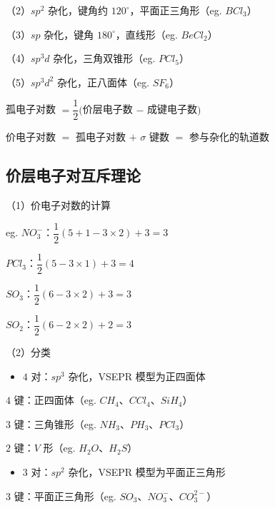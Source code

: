 \documentclass[UTF8,zihao=-4,openany]{ctexbook}
\begin{document}
（2）$sp^2$ 杂化，键角约 $120^{\circ}$，平面正三角形（eg. $BCl_3$）\par

（3）$sp$ 杂化，键角 $180^{\circ}$，直线形（eg. $BeCl_2$）\par

（4）$sp^3d$ 杂化，三角双锥形（eg. $PCl_5$）\par

（5）$sp^3d^2$ 杂化，正八面体（eg. $SF_6$）\par

孤电子对数 $=\dfrac{1}{2}($价层电子数 $-$ 成键电子数$)$\par

价电子对数 $=$ 孤电子对数 $+$ $\sigma$ 键数 $=$ 参与杂化的轨道数\par
\subsection{价层电子对互斥理论}
（1）价电子对数的计算\par

eg. $NO_3^-$：$\dfrac{1}{2}(5+1-3\times2)+3=3$\par

$PCl_3$：$\dfrac{1}{2}(5-3\times1)+3=4$\par

$SO_3$：$\dfrac{1}{2}(6-3\times2)+3=3$\par

$SO_2$：$\dfrac{1}{2}(6-2\times2)+2=3$\par

（2）分类\par

\begin{itemize}
\item $4$ 对：$sp^3$ 杂化，VSEPR 模型为正四面体
\end{itemize}

$4$ 键：正四面体（eg. $CH_4$、$CCl_4$、$SiH_4$）\par

$3$ 键：三角锥形（eg. $NH_3$、$PH_3$、$PCl_3$）\par

$2$ 键：$V$ 形（eg. $H_2O$、$H_2S$）\par

\begin{itemize}
\item $3$ 对：$sp^2$ 杂化，VSEPR 模型为平面正三角形
\end{itemize}

$3$ 键：平面正三角形（eg. $SO_3$、$NO_3^-$、$CO_3^{2-}$）\par
\end{document}
